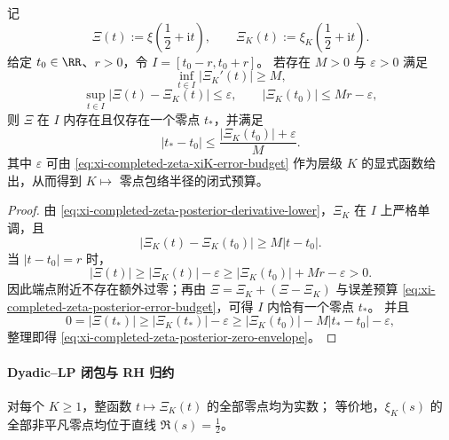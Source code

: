 \begin{proposition}[带误差预算的临界线后验零点证书]\label{prop:xi-completed-zeta-posterior-zero-certificate}
记
\[
\Xi(t):=\xi\!\left(\frac12+\mathrm{i}t\right),\qquad
\Xi_K(t):=\xi_K\!\left(\frac12+\mathrm{i}t\right).
\]
给定 \(t_0\in\RR\)、\(r>0\)，令 \(I=[t_0-r,t_0+r]\)。
若存在 \(M>0\) 与 \(\varepsilon>0\) 满足
\begin{equation}\label{eq:xi-completed-zeta-posterior-derivative-lower}
\inf_{t\in I}\left|\Xi_K'(t)\right|\ge M,
\end{equation}
\begin{equation}\label{eq:xi-completed-zeta-posterior-error-budget}
\sup_{t\in I}\left|\Xi(t)-\Xi_K(t)\right|\le \varepsilon,
\qquad
\left|\Xi_K(t_0)\right|\le Mr-\varepsilon,
\end{equation}
则 \(\Xi\) 在 \(I\) 内存在且仅存在一个零点 \(t_\ast\)，并满足
\begin{equation}\label{eq:xi-completed-zeta-posterior-zero-envelope}
\left|t_\ast-t_0\right|
\le
\frac{|\Xi_K(t_0)|+\varepsilon}{M}.
\end{equation}
其中 \(\varepsilon\) 可由 \eqref{eq:xi-completed-zeta-xiK-error-budget} 作为层级 \(K\) 的显式函数给出，从而得到 \(K\mapsto\) 零点包络半径的闭式预算。
\end{proposition}
\begin{proof}
由 \eqref{eq:xi-completed-zeta-posterior-derivative-lower}，\(\Xi_K\) 在 \(I\) 上严格单调，且
\[
|\Xi_K(t)-\Xi_K(t_0)|\ge M|t-t_0|.
\]
当 \(|t-t_0|=r\) 时，
\[
|\Xi(t)|\ge |\Xi_K(t)|-\varepsilon
\ge |\Xi_K(t_0)|+Mr-\varepsilon>0.
\]
因此端点附近不存在额外过零；再由 \(\Xi=\Xi_K+(\Xi-\Xi_K)\) 与误差预算 \eqref{eq:xi-completed-zeta-posterior-error-budget}，可得 \(I\) 内恰有一个零点 \(t_\ast\)。
并且
\[
0=|\Xi(t_\ast)|
\ge |\Xi_K(t_\ast)|-\varepsilon
\ge |\Xi_K(t_0)|-M|t_\ast-t_0|-\varepsilon,
\]
整理即得 \eqref{eq:xi-completed-zeta-posterior-zero-envelope}。
\end{proof}

\paragraph{Dyadic--LP 闭包与 RH 归约}
\begin{conjecture}\label{conj:xi-completed-zeta-dyadic-lp}
对每个 \(K\ge 1\)，整函数 \(t\mapsto \Xi_K(t)\) 的全部零点均为实数；
等价地，\(\xi_K(s)\) 的全部非平凡零点均位于直线 \(\Re(s)=\frac12\)。
\end{conjecture}

